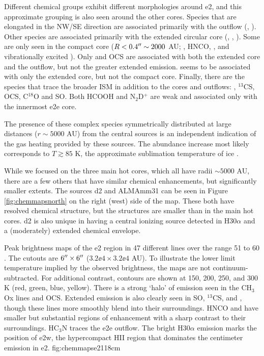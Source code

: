 \documentclass[twocolumn]{aastex61}
\begin{document}
Different chemical groups exhibit different morphologies around e2, and this
approximate grouping is also seen around the other cores.  Species that are
elongated in the NW/SE direction are associated primarily with the outflow
(\cyanoacetylene, \ethylcyanide).  Other species are associated primarily with
the extended circular core (\methylformate, \dimethylether, \acetone).  Some
are only seen in the compact core ($R<0.4\mbox{$^{\prime\prime}$}\sim2000$ AU;
\methyleneamidogen, HNCO, \formamide, and vibrationally excited
\cyanoacetylene).  Only \methanol and OCS are associated with both the extended
core and the outflow, but not the greater extended emission.  \ketene seems to
be associated with only the extended core, but not the compact core. Finally,
there are the species that trace the broader ISM in addition to the cores and
outflows: \formaldehyde, $^{13}$CS, OCS, C$^{18}$O and SO.  Both HCOOH and
N$_2$D$^+$ are weak and associated only with the innermost e2e core.

The presence of these complex species symmetrically distributed at large
distances ($r\sim5000$ AU) from the central sources is an independent
indication of the gas heating provided by these sources.  The abundance
increase most likely corresponds to $T\gtrsim85$ K, the approximate
sublimation temperature of \methanol ice \citep{Green2009a}.

While we focused on the three main hot cores, which all have radii $\sim5000$
AU, there are a few others that have similar chemical enhancements, but
significantly smaller extents.  The sources d2 and ALMAmm31 can be seen in
Figure \ref{fig:chemmapsnorth} on the right (west) side of the map.  These both
have resolved chemical structure, but the structures are smaller than in the
main hot cores.  d2 is also unique in having a central ionizing source detected
in H30$\alpha$ and a (moderately) extended chemical envelope.


{Peak brightness maps of the e2 region in 47 different lines over the range 51 to 60
\kms.
The cutouts are $6\mbox{$^{\prime\prime}$}\times6\mbox{$^{\prime\prime}$}$ ($3.2\ee{4}\times3.2\ee{4}$ AU).
To illustrate the lower limit temperature implied by the observed brightness,
the maps are not continuum-subtracted.  
For additional contrast, contours are shown at 150, 200, 250, and 300 K
(red, green, blue, yellow).
There
is a strong `halo' of emission seen in the CH$_3$Ox lines and OCS.  Extended
emission is also clearly seen in SO, $^{13}$CS, and \formaldehyde, though these
lines more smoothly blend into their surroundings.  HNCO and \formamide have
smaller but substantial regions of enhancement with a sharp contrast to their
surroundings.  HC$_3$N traces the e2e outflow.  The bright H30$\alpha$ emission
marks the position of e2w, the hypercompact HII region that dominates the
centimeter emission in e2.
}{fig:chemmapse2}{1}{18cm}
\end{document}

